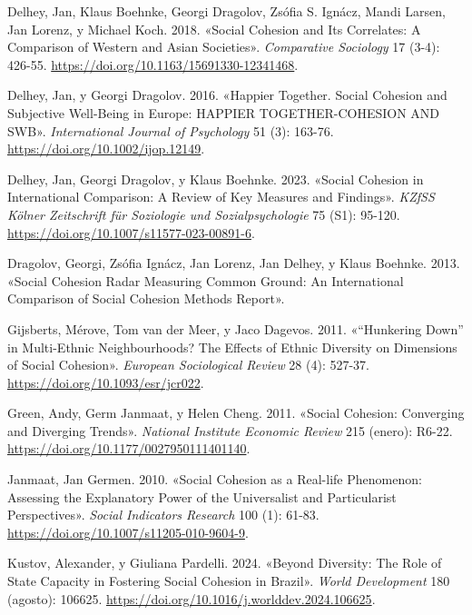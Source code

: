 \documentclass[
  letterpaper,
  DIV=11,
  numbers=noendperiod]{scrartcl}
\newlength{\cslhangindent}
\newenvironment{CSLReferences}[2] %
 {\begin{list}{}{%
  \setlength{\itemindent}{0pt}
  \setlength{\leftmargin}{0pt}
  \setlength{\parsep}{0pt}
  \ifodd #1
   \setlength{\leftmargin}{\cslhangindent}
   \setlength{\itemindent}{-1\cslhangindent}
  \fi
  \setlength{\itemsep}{#2\baselineskip}}}
 {\end{list}}
\begin{document}
\begin{CSLReferences}{1}{0}
Delhey, Jan, Klaus Boehnke, Georgi Dragolov, Zsófia S. Ignácz, Mandi
Larsen, Jan Lorenz, y Michael Koch. 2018. {«Social {Cohesion} and {Its
Correlates}: A {Comparison} of {Western} and {Asian Societies}»}.
\emph{Comparative Sociology} 17 (3-4): 426-55.
\url{https://doi.org/10.1163/15691330-12341468}.

Delhey, Jan, y Georgi Dragolov. 2016. {«Happier {Together}. {Social
Cohesion} and {Subjective Well-Being} in {Europe}: {HAPPIER
TOGETHER-COHESION AND SWB}»}. \emph{International Journal of Psychology}
51 (3): 163-76. \url{https://doi.org/10.1002/ijop.12149}.

Delhey, Jan, Georgi Dragolov, y Klaus Boehnke. 2023. {«Social {Cohesion}
in {International Comparison}: A {Review} of {Key Measures} and
{Findings}»}. \emph{KZfSS K{ö}lner Zeitschrift f{ü}r Soziologie und
Sozialpsychologie} 75 (S1): 95-120.
\url{https://doi.org/10.1007/s11577-023-00891-6}.

Dragolov, Georgi, Zsófia Ignácz, Jan Lorenz, Jan Delhey, y Klaus
Boehnke. 2013. {«Social {Cohesion Radar Measuring Common Ground}: {An
International Comparison} of {Social Cohesion Methods Report}»}.

Gijsberts, Mérove, Tom van der Meer, y Jaco Dagevos. 2011.
{«{``{Hunkering Down}''} in {Multi-Ethnic Neighbourhoods}? {The Effects}
of {Ethnic Diversity} on {Dimensions} of {Social Cohesion}»}.
\emph{European Sociological Review} 28 (4): 527-37.
\url{https://doi.org/10.1093/esr/jcr022}.

Green, Andy, Germ Janmaat, y Helen Cheng. 2011. {«Social {Cohesion}:
{Converging} and {Diverging Trends}»}. \emph{National Institute Economic
Review} 215 (enero): R6-22.
\url{https://doi.org/10.1177/0027950111401140}.

Janmaat, Jan Germen. 2010. {«Social {Cohesion} as a {Real-life
Phenomenon}: {Assessing} the {Explanatory Power} of the {Universalist}
and {Particularist Perspectives}»}. \emph{Social Indicators Research}
100 (1): 61-83. \url{https://doi.org/10.1007/s11205-010-9604-9}.

Kustov, Alexander, y Giuliana Pardelli. 2024. {«Beyond {Diversity}: {The
Role} of {State Capacity} in {Fostering Social Cohesion} in {Brazil}»}.
\emph{World Development} 180 (agosto): 106625.
\url{https://doi.org/10.1016/j.worlddev.2024.106625}.


\end{CSLReferences}
\end{document}
